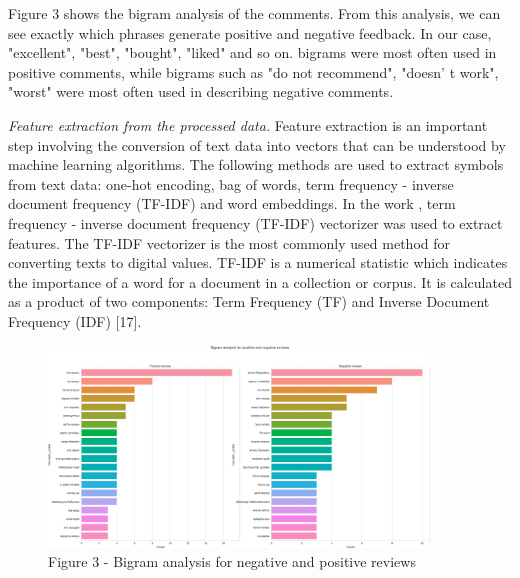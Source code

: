 \begin{multicols}{2}
Figure 3 shows the bigram analysis of the comments. From this analysis,
we can see exactly which phrases generate positive and negative
feedback. In our case, "excellent", "best", "bought", "liked" and so on.
bigrams were most often used in positive comments, while bigrams such as
"do not recommend", "doesn' t work", "worst" were most
often used in describing negative comments.

\emph{Feature extraction from the processed data.} Feature extraction is
an important step involving the conversion of text data into vectors
that can be understood by machine learning algorithms. The following
methods are used to extract symbols from text data: one-hot encoding,
bag of words, term frequency - inverse document frequency (TF-IDF) and
word embeddings. In the work , term frequency - inverse document
frequency (TF-IDF) vectorizer was used to extract features. The TF-IDF
vectorizer is the most commonly used method for converting texts to
digital values. TF-IDF is a numerical statistic which indicates the
importance of a word for a document in a collection or corpus. It is
calculated as a product of two components: Term Frequency (TF) and
Inverse Document Frequency (IDF) {[}17{]}.
\end{multicols}

\begin{figure}[H]
	\centering
	\includegraphics[width=0.9\textwidth]{media/ict/image11}
	\caption*{Figure 3 - Bigram analysis for negative and positive reviews}
\end{figure}

